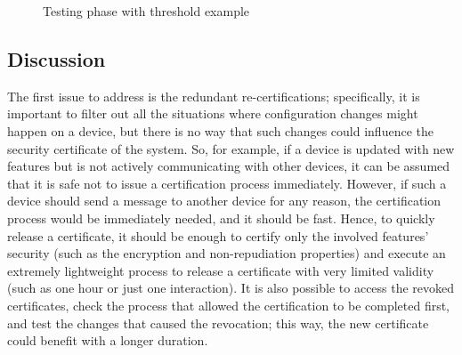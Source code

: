 \begin{figure}[ht]
    \centering
    \caption{Testing phase with threshold example}
    \label{fig:thex}
\end{figure}

\subsection{Discussion}
The first issue to address is the redundant re-certifications; specifically, it is important to filter out all the situations where configuration changes might happen on a device, but there is no way that such changes could influence the security certificate of the system. So, for example, if a device is updated with new features but is not actively communicating with other devices, it can be assumed that it is safe not to issue a certification process immediately. However, if such a device should send a message to another device for any reason, the certification process would be immediately needed, and it should be fast. Hence, to quickly release a certificate, it should be enough to certify only the involved features' security (such as the encryption and non-repudiation properties) and execute an extremely lightweight process to release a certificate with very limited validity (such as one hour or just one interaction). It is also possible to access the revoked certificates, check the process that allowed the certification to be completed first, and test the changes that caused the revocation; this way, the new certificate could benefit with a longer duration.

